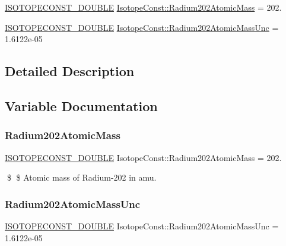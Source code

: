 \begin{DoxyCompactItemize}
\item 
\mbox{\hyperlink{group___isotope_const-_macros_ga8f45a7272ce02c0b4c65c44636ed719a}{I\+S\+O\+T\+O\+P\+E\+C\+O\+N\+S\+T\+\_\+\+D\+O\+U\+B\+LE}} \mbox{\hyperlink{group___isotope_const-_radium-_ra202_gae3f586f9be95e8a97e7338e4065de848}{Isotope\+Const\+::\+Radium202\+Atomic\+Mass}} = 202.
\item 
\mbox{\hyperlink{group___isotope_const-_macros_ga8f45a7272ce02c0b4c65c44636ed719a}{I\+S\+O\+T\+O\+P\+E\+C\+O\+N\+S\+T\+\_\+\+D\+O\+U\+B\+LE}} \mbox{\hyperlink{group___isotope_const-_radium-_ra202_gad1e28a757f48a17450690d286bac0728}{Isotope\+Const\+::\+Radium202\+Atomic\+Mass\+Unc}} = 1.\+6122e-\/05
\end{DoxyCompactItemize}


\subsection{Detailed Description}


\subsection{Variable Documentation}
\mbox{\label{group___isotope_const-_radium-_ra202_gae3f586f9be95e8a97e7338e4065de848}} 
\subsubsection{\texorpdfstring{Radium202\+Atomic\+Mass}{Radium202AtomicMass}}
{\footnotesize\ttfamily \mbox{\hyperlink{group___isotope_const-_macros_ga8f45a7272ce02c0b4c65c44636ed719a}{I\+S\+O\+T\+O\+P\+E\+C\+O\+N\+S\+T\+\_\+\+D\+O\+U\+B\+LE}} Isotope\+Const\+::\+Radium202\+Atomic\+Mass = 202.}

\$ \$ Atomic mass of Radium-\/202 in amu. \mbox{\label{group___isotope_const-_radium-_ra202_gad1e28a757f48a17450690d286bac0728}} 
\subsubsection{\texorpdfstring{Radium202\+Atomic\+Mass\+Unc}{Radium202AtomicMassUnc}}
{\footnotesize\ttfamily \mbox{\hyperlink{group___isotope_const-_macros_ga8f45a7272ce02c0b4c65c44636ed719a}{I\+S\+O\+T\+O\+P\+E\+C\+O\+N\+S\+T\+\_\+\+D\+O\+U\+B\+LE}} Isotope\+Const\+::\+Radium202\+Atomic\+Mass\+Unc = 1.\+6122e-\/05}

